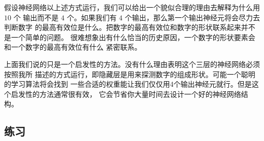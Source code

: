 假设神经网络以上述方式运行，我们可以给出一个貌似合理的理由去解释为什么用 $10$ 个
输出而不是 $4$ 个。如果我们有 $4$ 个输出，那么第一个输出神经元将会尽力去判断数字
的最高有效位是什么。把数字的最高有效位和数字的形状联系起来并不是一个简单的问题。
很难想象出有什么恰当的历史原因，一个数字的形状要素会和一个数字的最高有效位有什么
紧密联系。

上面我们说的只是一个启发性的方法。没有什么理由表明这个三层的神经网络必须按照我所
描述的方式运行，即隐藏层是用来探测数字的组成形状。可能一个聪明的学习算法将会找到
一些合适的权重能让我们仅仅用4个输出神经元就行。但是这个启发性的方法通常很有效，
它会节省你大量时间去设计一个好的神经网络结构。

\subsection*{练习}

